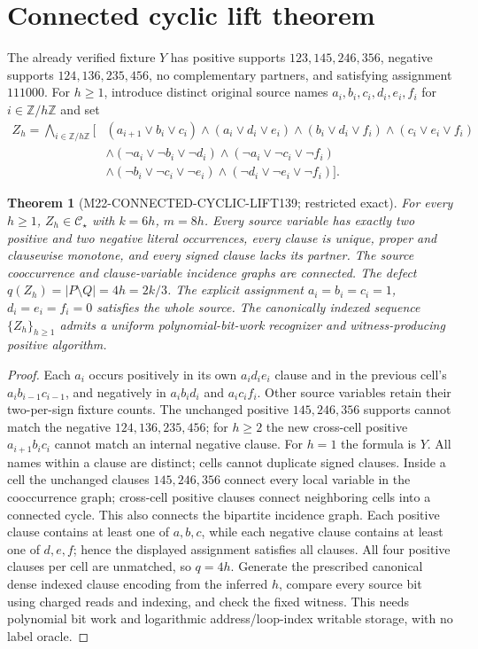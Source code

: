 \documentclass[11pt]{article}
\newtheorem{theorem}{Theorem}
\newcommand{\Cs}{\mathcal C_\star}
\begin{document}
\section{Connected cyclic lift theorem}
The already verified fixture \(Y\) has positive supports \(123,145,246,356\), negative supports \(124,136,235,456\), no complementary partners, and satisfying assignment \(111000\). For \(h\ge1\), introduce distinct original source names \(a_i,b_i,c_i,d_i,e_i,f_i\) for \(i\in\mathbb Z/h\mathbb Z\) and set
\[
\begin{aligned}
Z_h=\bigwedge_{i\in\mathbb Z/h\mathbb Z}\bigl[&
(a_{i+1}\vee b_i\vee c_i)\wedge(a_i\vee d_i\vee e_i)
\wedge(b_i\vee d_i\vee f_i)\wedge(c_i\vee e_i\vee f_i)\\
&\wedge(\neg a_i\vee\neg b_i\vee\neg d_i)
\wedge(\neg a_i\vee\neg c_i\vee\neg f_i)\\
&\wedge(\neg b_i\vee\neg c_i\vee\neg e_i)
\wedge(\neg d_i\vee\neg e_i\vee\neg f_i)\bigr].
\end{aligned}
\]
\begin{theorem}[M22-CONNECTED-CYCLIC-LIFT139; restricted exact]
For every \(h\ge1\), \(Z_h\in\Cs\) with \(k=6h\), \(m=8h\). Every source variable has exactly two positive and two negative literal occurrences, every clause is unique, proper and clausewise monotone, and \emph{every} signed clause lacks its partner. The source cooccurrence and clause-variable incidence graphs are connected. The defect \(q(Z_h)=|P\setminus Q|=4h=2k/3\). The explicit assignment \(a_i=b_i=c_i=1\), \(d_i=e_i=f_i=0\) satisfies the whole source. The canonically indexed sequence \(\{Z_h\}_{h\ge1}\) admits a uniform polynomial-bit-work recognizer and witness-producing positive algorithm.
\end{theorem}
\begin{proof}
Each \(a_i\) occurs positively in its own \(a_id_ie_i\) clause and in the previous cell's \(a_ib_{i-1}c_{i-1}\), and negatively in \(a_ib_id_i\) and \(a_ic_if_i\). Other source variables retain their two-per-sign fixture counts. The unchanged positive \(145,246,356\) supports cannot match the negative \(124,136,235,456\); for \(h\ge2\) the new cross-cell positive \(a_{i+1}b_ic_i\) cannot match an internal negative clause. For \(h=1\) the formula is \(Y\). All names within a clause are distinct; cells cannot duplicate signed clauses. Inside a cell the unchanged clauses \(145,246,356\) connect every local variable in the cooccurrence graph; cross-cell positive clauses connect neighboring cells into a connected cycle. This also connects the bipartite incidence graph. Each positive clause contains at least one of \(a,b,c\), while each negative clause contains at least one of \(d,e,f\); hence the displayed assignment satisfies all clauses. All four positive clauses per cell are unmatched, so \(q=4h\). Generate the prescribed canonical dense indexed clause encoding from the inferred \(h\), compare every source bit using charged reads and indexing, and check the fixed witness. This needs polynomial bit work and logarithmic address/loop-index writable storage, with no label oracle.
\end{proof}
\end{document}
